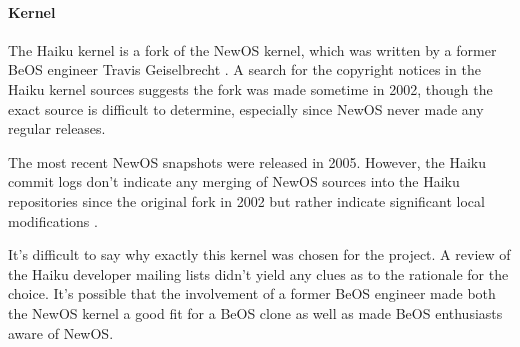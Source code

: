 \documentclass{article}
\begin{document}


\paragraph{Kernel}
The Haiku kernel is a fork of the NewOS kernel, which was written by a
former BeOS engineer Travis Geiselbrecht \cite{HaikuWiki}.  A search
for the copyright notices in the Haiku kernel sources suggests the
fork was made sometime in 2002, though the exact source is difficult
to determine, especially since NewOS never made any regular releases.

The most recent NewOS snapshots were released in 2005.  However, the
Haiku commit logs don't indicate any merging of NewOS sources into the
Haiku repositories since the original fork in 2002 but rather indicate
significant local modifications \cite{HaikuKernelCommitLogs}.

It's difficult to say why exactly this kernel was chosen for the
project.  A review of the Haiku developer mailing lists didn't yield
any clues as to the rationale for the choice.  It's possible that the
involvement of a former BeOS engineer made both the NewOS kernel a
good fit for a BeOS clone as well as made BeOS enthusiasts aware of
NewOS.
\end{document}
